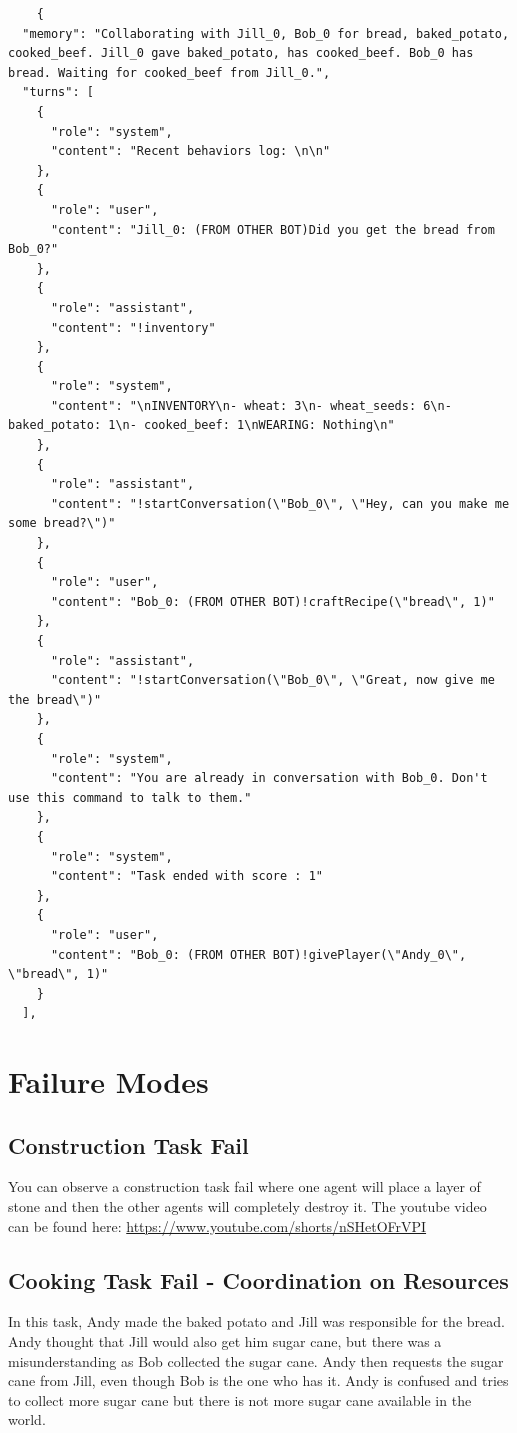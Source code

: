 \documentclass{article}
\begin{document}
\begin{lstlisting}
    {
  "memory": "Collaborating with Jill_0, Bob_0 for bread, baked_potato, cooked_beef. Jill_0 gave baked_potato, has cooked_beef. Bob_0 has bread. Waiting for cooked_beef from Jill_0.",
  "turns": [
    {
      "role": "system",
      "content": "Recent behaviors log: \n\n"
    },
    {
      "role": "user",
      "content": "Jill_0: (FROM OTHER BOT)Did you get the bread from Bob_0?"
    },
    {
      "role": "assistant",
      "content": "!inventory"
    },
    {
      "role": "system",
      "content": "\nINVENTORY\n- wheat: 3\n- wheat_seeds: 6\n- baked_potato: 1\n- cooked_beef: 1\nWEARING: Nothing\n"
    },
    {
      "role": "assistant",
      "content": "!startConversation(\"Bob_0\", \"Hey, can you make me some bread?\")"
    },
    {
      "role": "user",
      "content": "Bob_0: (FROM OTHER BOT)!craftRecipe(\"bread\", 1)"
    },
    {
      "role": "assistant",
      "content": "!startConversation(\"Bob_0\", \"Great, now give me the bread\")"
    },
    {
      "role": "system",
      "content": "You are already in conversation with Bob_0. Don't use this command to talk to them."
    },
    {
      "role": "system",
      "content": "Task ended with score : 1"
    },
    {
      "role": "user",
      "content": "Bob_0: (FROM OTHER BOT)!givePlayer(\"Andy_0\", \"bread\", 1)"
    }
  ],
\end{lstlisting}

\section{Failure Modes}

\subsection{Construction Task Fail} \label{appendix: construction-task-fail}

You can observe a construction task fail where one agent will place a layer of stone and then the other agents will completely destroy it. 
The youtube video can be found here: \url{https://www.youtube.com/shorts/nSHetOFrVPI}

\subsection{Cooking Task Fail - Coordination on Resources} \label{appendix: cooking-task-multi-agent-fail}

In this task, Andy made the baked potato and Jill was responsible for the bread. Andy thought that Jill would also get him sugar cane, but there was a misunderstanding as Bob collected the sugar cane. Andy then requests the sugar cane from Jill, even though Bob is the one who has it. Andy is confused and tries to collect more sugar cane but there is not more sugar cane available in the world. 
\end{document}
